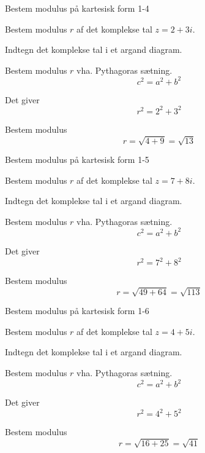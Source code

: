 \documentclass{article}
\begin{document}
\newpage

\begin{exercise}{Bestem modulus på kartesisk form 1-4}
	
	Bestem modulus $r$ af det komplekse tal $z=2+3i$.
	
	
	
	\hint 
	
	Indtegn det komplekse tal i et argand diagram.
	
	
	\hint
	
	Bestem modulus $r$ vha. Pythagoras sætning.
	\[
	c^2 = a^2 + b^2
	\]
	
	\hint 
	
	Det giver
	\[
	r^2 = 2^2 + 3^2
	\]
	
	\hint
	
	Bestem modulus
	\[
	r  = \sqrt{4+9} = \sqrt{13}
	\]
	
	
	
\end{exercise}


\newpage

\begin{exercise}{Bestem modulus på kartesisk form 1-5}
	
	Bestem modulus $r$ af det komplekse tal $z=7+8i$.
	
	
	
	\hint 
	
	Indtegn det komplekse tal i et argand diagram.
	
	
	\hint
	
	Bestem modulus $r$ vha. Pythagoras sætning.
	\[
	c^2 = a^2 + b^2
	\]
	
	\hint 
	
	Det giver
	\[
	r^2 = 7^2 + 8^2
	\]
	
	\hint
	
	Bestem modulus
	\[
	r  = \sqrt{49+64} = \sqrt{113} 
	\]
	
	
	
\end{exercise}


\newpage

\begin{exercise}{Bestem modulus på kartesisk form 1-6}
	
	Bestem modulus $r$ af det komplekse tal $z=4+5i$.
	
	
	
	\hint 
	
	Indtegn det komplekse tal i et argand diagram.
	
	
	\hint
	
	Bestem modulus $r$ vha. Pythagoras sætning.
	\[
	c^2 = a^2 + b^2
	\]
	
	\hint 
	
	Det giver
	\[
	r^2 = 4^2 + 5^2
	\]
	
	\hint
	
	Bestem modulus
	\[
	r  = \sqrt{16+25} = \sqrt{41} 
	\]
	
	
	
\end{exercise}
\end{document}
